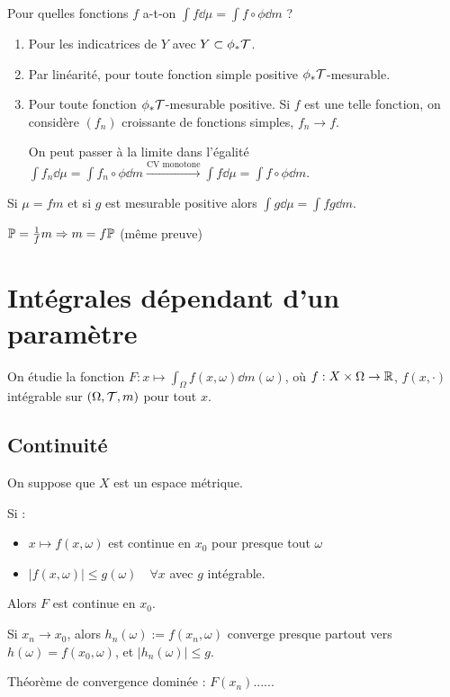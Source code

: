 \documentclass[10pt,a4paper,notitlepage ]{report}
\begin{document}
\begin{demo}
	Pour quelles fonctions $f$ a-t-on $\int f\dd \mu = \int f \circ \phi \dd m$ ?
	\begin{enumerate}
		\item Pour les indicatrices de $Y$ avec $Y \subset \phi_*\mathcal T$.
		\item Par linéarité, pour toute fonction simple positive $\phi_*\mathcal T$-mesurable.
		\item Pour toute fonction $\phi_*\mathcal T$-mesurable positive. Si $f$ est une telle fonction, on considère $(f_n)$ croissante de fonctions simples, $f_n \rightarrow f$.
		
		On peut passer à la limite dans l'égalité $\int f_n \dd \mu = \int f_n \circ \phi \dd m \overset{\text{CV monotone}} \longrightarrow \int f \dd\mu = \int f\circ \phi \dd m$.
	\end{enumerate}
\end{demo}

\begin{propriete}
	Si $\mu = fm$ et si $g$ est mesurable positive alors $\int g \dd \mu = \int fg \dd m$.
\end{propriete}

\begin{rem}
	$\mathbb P = \frac 1 f m \Rightarrow m=f\mathbb P$ (même preuve)
\end{rem}

\section{Intégrales dépendant d'un paramètre}

On étudie la fonction $F : x \mapsto \int_\Omega f(x,\omega) \dd m(\omega)$, où $f:X\times \Omega \rightarrow \mathbb R$, $f(x, \cdot)$ intégrable sur $(\Omega,\mathcal T,m)$ pour tout $x$.

\subsection{Continuité}
On suppose que $X$ est un espace métrique.
\begin{theorem}
	Si : \begin{itemize}
		\item $x\mapsto f(x,\omega)$ est continue en $x_0$ pour presque tout $\omega$
		\item $|f(x,\omega)| \le g(\omega) \quad \forall x$ avec $g$ intégrable.
	\end{itemize}
	Alors $F$ est continue en $x_0$.
\end{theorem}
\begin{demo}
	Si $x_n \rightarrow x_0$, alors $h_n(\omega) := f(x_n,\omega)$ converge presque partout vers $h(\omega)=f(x_0,\omega)$, et $|h_n(\omega)| \le g$.
	
	Théorème de convergence dominée : $F(x_n) ......$
\end{demo}
\end{document}
